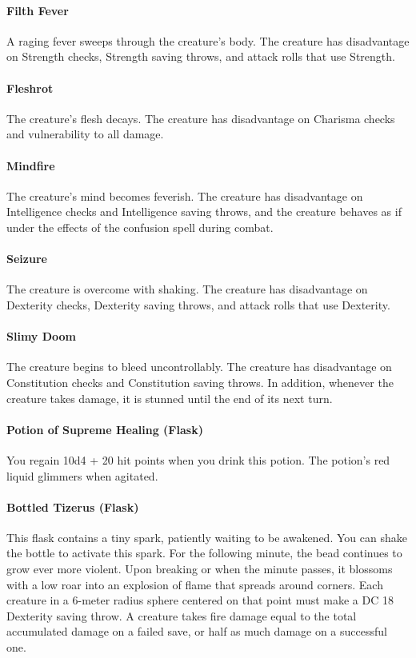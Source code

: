     \paragraph{Filth Fever} A raging fever sweeps through the creature's body.
    The creature has disadvantage on Strength checks, Strength saving throws, and attack rolls that use Strength.
    \paragraph{Fleshrot} The creature's flesh decays.
    The creature has disadvantage on Charisma checks and vulnerability to all damage.
    \paragraph{Mindfire} The creature's mind becomes feverish.
    The creature has disadvantage on Intelligence checks and Intelligence saving throws, and the creature behaves as if under the effects of the confusion spell during combat.
    \paragraph{Seizure} The creature is overcome with shaking.
    The creature has disadvantage on Dexterity checks, Dexterity saving throws, and attack rolls that use Dexterity.
    \paragraph{Slimy Doom} The creature begins to bleed uncontrollably.
    The creature has disadvantage on Constitution checks and Constitution saving throws.
    In addition, whenever the creature takes damage, it is stunned until the end of its next turn.
\paragraph{Potion of Supreme Healing (Flask)}
    You regain 10d4 + 20 hit points when you drink this potion.
    The potion's red liquid glimmers when agitated.
\paragraph{Bottled Tizerus (Flask)} %
    This flask contains a tiny spark, patiently waiting to be awakened.
    You can shake the bottle to activate this spark.
    For the following minute, the bead continues to grow ever more violent.
    Upon breaking or when the minute passes, it blossoms with a low roar into an explosion of flame that spreads around corners.
    Each creature in a 6-meter radius sphere centered on that point must make a DC 18 Dexterity saving throw.
    A creature takes fire damage equal to the total accumulated damage on a failed save, or half as much damage on a successful one.

